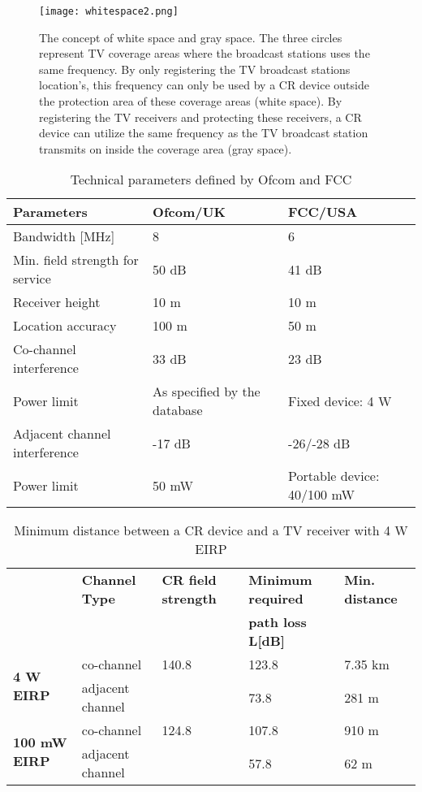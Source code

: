 \documentclass[journal,11pt,draftclsnofoot,onecolumn]{IEEEtran}
\begin{document}

{}
\clearpage
\begin{figure}
\centering
\texttt{[image: whitespace2.png]}
\caption{The concept of white space and gray space. The three circles represent TV coverage areas where the broadcast stations uses the same frequency. By only registering the TV broadcast stations location's, this frequency can only be used by a CR device outside the protection area of these coverage areas (white space). By registering the TV receivers and protecting these receivers, a CR device can utilize the same frequency as the TV broadcast station transmits on inside the coverage area (gray space).}
\label{fig:concept}
\end{figure}
\begin{table*}[t!]
\centering
\caption{Technical parameters defined by Ofcom and FCC}
\begin{tabular}{|l|l|l|}
\hline
\textbf{Parameters} & \textbf{Ofcom/UK} & \textbf{FCC/USA} \\
\hline
Bandwidth [MHz] & 8 & 6 \\
\hline
Min. field strength for service & 50 dB & 41 dB \\
\hline
Receiver height & 10 m & 10 m \\
\hline
Location accuracy & 100 m  & 50 m \\
\hline 
Co-channel interference & 33 dB & 23 dB \\
Power limit & As specified by the database & Fixed device: 4 W \\
\hline
Adjacent channel interference & -17 dB & -26/-28 dB \\
Power limit & 50 mW & Portable device: 40/100 mW \\
\hline
\end{tabular}
\label{tab:1}
\end{table*}

\begin{table*}
\centering
\caption{Minimum distance between a CR device and a TV receiver with 4 W EIRP}
\begin{tabular}{|l|l|l|l|l|}
\hline
 & \textbf{Channel Type} & \textbf{CR field strength} & \textbf{Minimum required} & \textbf{Min. distance} \\
 & & & \textbf{path loss L[dB]} & \\
\hline
\multirow{2}{*}{\textbf{4 W EIRP}} & co-channel & 140.8 & 123.8 & 7.35 km \\
& adjacent channel& & 73.8 & 281 m \\
\hline
\multirow{2}{*}{\textbf{100 mW EIRP}} & co-channel & 124.8 & 107.8 & 910 m \\
& adjacent channel & & 57.8 & 62 m\\
\hline
\end{tabular}
\label{tab:min-dist}
\end{table*}
\end{document}
